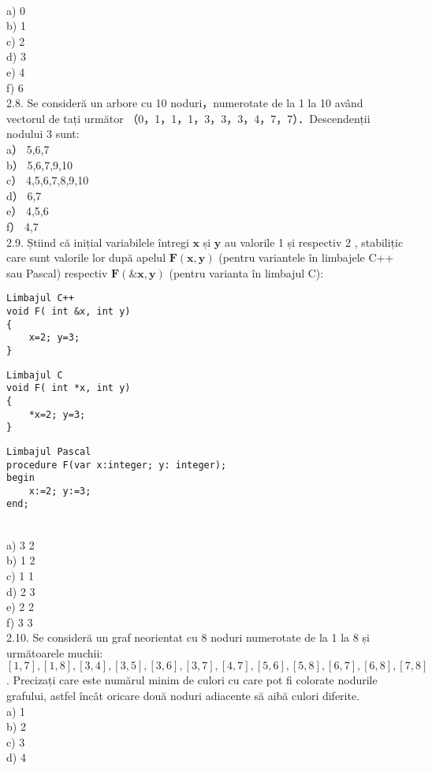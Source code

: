 \\
a) 0
\\
b) 1
\\
c) 2
\\
d) 3
\\
e) 4
\\
f) 6
\\
2.8. Se consideră un arbore cu 10 noduri，numerotate de la 1 la 10 având vectorul de tați următor （0，1，1，1，3，3，3，4，7，7）．Descendenții nodului 3 sunt:
\\
a） 5,6,7
\\
b） 5,6,7,9,10
\\
c） 4,5,6,7,8,9,10
\\
d） 6,7
\\
e） 4,5,6
\\
f） 4,7
\\
2.9. Știind că inițial variabilele întregi $\mathbf{x}$ și $\mathbf{y}$ au valorile 1 și respectiv 2 , stabilițic care sunt valorile lor după apelul $\mathbf{F}(\mathbf{x}, \mathbf{y})$ (pentru variantele în limbajele C++ sau Pascal) respectiv $\mathbf{F}(\& \mathbf{x}, \mathbf{y})$ (pentru varianta în limbajul C):
\begin{verbatim}
Limbajul C++
void F( int &x, int y)
{
    x=2; y=3;
}
\end{verbatim}
\begin{verbatim}
Limbajul C
void F( int *x, int y)
{
    *x=2; y=3;
}
\end{verbatim}
\begin{verbatim}
Limbajul Pascal
procedure F(var x:integer; y: integer);
begin
    x:=2; y:=3;
end;
\end{verbatim}
\\
a) 3 2
\\
b) 1 2
\\
c) 1 1
\\
d) 2 3
\\
e) 2 2
\\
f) 3 3
\\
2.10. Se consideră un graf neorientat cu 8 noduri numerotate de la 1 la 8 și următoarele muchii: $[1,7],[1,8],[3,4],[3,5],[3,6],[3,7],[4,7],[5,6],[5,8],[6,7],[6,8],[7,8]$. Precizați care este numărul minim de culori cu care pot fi colorate nodurile grafului, astfel încât oricare două noduri adiacente să aibă culori diferite.
\\
a) 1
\\
b) 2
\\
c) 3
\\
d) 4
\\
